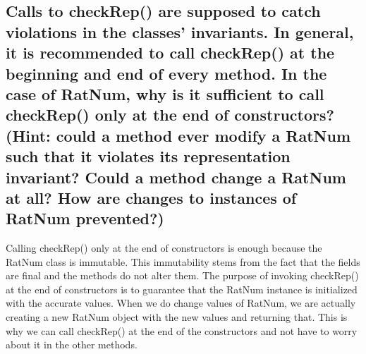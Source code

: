 \documentclass[11pt]{article}
\begin{document}
\subsection{Calls to checkRep() are supposed to catch violations in the classes’ invariants. In general, it
is recommended to call checkRep() at the beginning and end of every method. In the case of
RatNum, why is it sufficient to call checkRep() only at the end of constructors? (Hint: could
a method ever modify a RatNum such that it violates its representation invariant? Could a
method change a RatNum at all? How are changes to instances of RatNum prevented?)}

Calling checkRep() only at the end of constructors is enough because the RatNum class is immutable. This immutability stems from the fact that the fields are final and the methods do not alter them. The purpose of invoking checkRep() at the end of constructors is to guarantee that the RatNum instance is initialized with the accurate values.
When we do change values of RatNum, we are actually creating a new RatNum object with the new values and returning that. This is why we can call checkRep() at the end of the constructors and not have to worry about it in the other methods.
\end{document}
